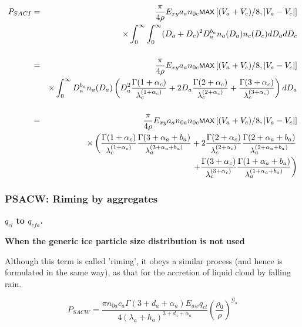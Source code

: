\documentclass{UMDP_article}
\newcommand{\mmax}[1] {\mbox{\footnotesize \sf MAX} \left[#1\right]  }
\begin{document}
\begin{eqnarray}
 P_{SACI}&=&\frac{\pi}{4\rho} E_{xy}a_a n_{0c}\mmax{(V_a+V_c)/8,| V_a -V_c |}
          \nonumber \\
         & &\times\int_0^\infty\int_0^\infty (D_a+D_c)^2
          D_a^{b_a}n_a(D_a) n_c(D_c) dD_a dD_c
          \nonumber \\[0.5cm]
           &=&\frac{\pi}{4\rho}E_{xy}a_a n_{0c}\mmax{(V_a+V_c)/8,| V_a -V_c |}
          \nonumber \\
           & & \times  \int_0^\infty D_a^{b_a} n_a(D_a)
              \left(D_a^2\frac{\Gamma(1+\alpha_c)}{\lambda_c^{(1+\alpha_c)}}
                   +2D_a\frac{\Gamma(2+\alpha_c)}{\lambda_c^{(2+\alpha_c)}}
                +\frac{\Gamma(3+\alpha_c)}{\lambda_c^{(3+\alpha_c)}}\right)dD_a
          \nonumber \\[0.5cm]
          &=&\frac{\pi}{4\rho}E_{xy}a_an_{0a}n_{0c}
                                  \mmax{(V_a+V_c)/8,| V_a -V_c |}
          \nonumber \\
           & &\times
           \left(\frac{\Gamma(1+\alpha_c)}{\lambda_c^{(1+\alpha_c)}}
                 \frac{\Gamma(3+\alpha_a+b_a)}{\lambda_a^{(3+\alpha_a+b_a)}}
               +2\frac{\Gamma(2+\alpha_c)}{\lambda_c^{(2+\alpha_c)}}
                 \frac{\Gamma(2+\alpha_a+b_a)}{\lambda_a^{(2+\alpha_a+b_a)}}
 \right. \nonumber \\ & & \left. \hspace{1.5cm}
                +\frac{\Gamma(3+\alpha_c)}{\lambda_c^{(3+\alpha_c)}}
                 \frac{\Gamma(1+\alpha_a+b_a)}{\lambda_a^{(1+\alpha_a+b_a)}}
                                                           \right)
\label{eq:mic_pyacx2}
\end{eqnarray}

\newpage

\subsubsection{PSACW:  Riming by aggregates}
\label{sec:PSACW}

\textbf{$q_{cl}$ to $q_{cfa}$.}

\textbf{When the generic ice particle size distribution is not used}

Although this term is called 'riming', it obeys a similar process 
(and hence is formulated in the same way), as that for the accretion of 
liquid cloud by falling rain. 

\begin{equation}
 P_{SACW}=\frac{\pi n_{0a} c_a  \Gamma (3+d_a+\alpha_a) E_{aw} q_{cl}}
            {4(\lambda_a+h_a)^{3+d_a+\alpha_a}}
        \left(\frac{\rho_0}{\rho}\right)^{\mathcal{G}_a}
\label{eq:mic_psacw}
\end{equation}
\end{document}
